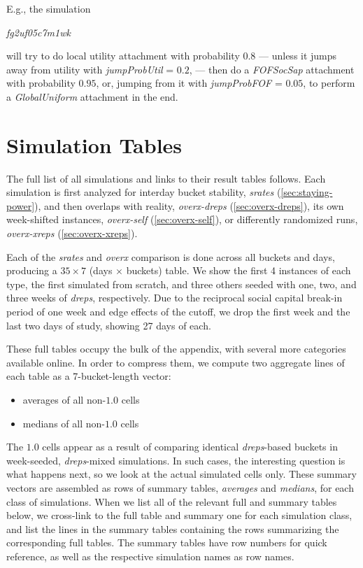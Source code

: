 \documentclass[10pt,oneside]{memoir}
\begin{document}
E.g., the simulation


{\itshape fg2uf05c7m1wk}


will try to do local utility attachment with probability $0.8$ --- unless it jumps away from utility with {\itshape jumpProbUtil} = $0.2$, --- then do a {\itshape FOFSocSap} attachment with probability $0.95$, or, jumping from it with {\itshape jumpProbFOF} = $0.05$, to perform a {\itshape GlobalUniform} attachment in the end.


\section{Simulation Tables}
\label{simulationtables}

The full list of all simulations and links to their result tables follows.  Each simulation is first analyzed for interday bucket stability, {\itshape srates} (\ref{sec:staying-power}), and then overlaps with reality, {\itshape overx-dreps} (\ref{sec:overx-dreps}), its own week-shifted instances, {\itshape overx-self} (\ref{sec:overx-self}), or differently randomized runs, {\itshape overx-xreps} (\ref{sec:overx-xreps}).


Each of the {\itshape srates} and {\itshape overx} comparison is done across all buckets and days, producing a $35 \times 7$ (days $\times$ buckets) table.  We show the first 4 instances of each type, the first simulated from scratch, and three others seeded with one, two, and three weeks of {\itshape dreps}, respectively.  Due to the reciprocal social capital break-in period of one week and edge effects of the cutoff, we drop the first week and the last two days of study, showing 27 days of each.


These full tables occupy the bulk of the appendix, with several more categories available online.  In order to compress them, we compute two aggregate lines of each table as a 7-bucket-length vector:


\begin{itemize}


\item averages of all non-$1.0$ cells

\item medians of all non-$1.0$ cells
\end{itemize}

The $1.0$ cells appear as a result of comparing identical {\itshape dreps}-based buckets in week-seeded, {\itshape dreps}-mixed simulations.  In such cases, the interesting question is what happens next, so we look at the actual simulated cells only.  These summary vectors are assembled as rows of summary tables, {\itshape averages} and {\itshape medians}, for each class of simulations.  When we list all of the relevant full and summary tables below, we cross-link to the full table and summary one for each simulation class, and list the lines in the summary tables containing the rows summarizing the corresponding full tables.  The summary tables have row numbers for quick reference, as well as the respective simulation names as row names.
\end{document}
